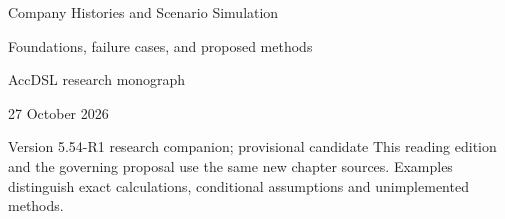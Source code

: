 \documentclass[11pt,a4paper]{report}
\begin{document}
\hypersetup{pageanchor=false}
\begin{titlepage}
{\Huge Company Histories and Scenario Simulation\par}
\vspace{12mm}
{\Large Foundations, failure cases, and proposed methods\par}
\vspace{8mm}
AccDSL research monograph\par 27 October 2026\par Version 5.54-R1 research companion; provisional candidate
\vfill
This reading edition and the governing proposal use the same new chapter sources. Examples distinguish exact calculations, conditional assumptions and unimplemented methods.
\end{titlepage}
\hypersetup{pageanchor=true}
\tableofcontents
\clearpage{}


























\clearpage\label{sim:body-end}

\begingroup\raggedright
\endgroup
\end{document}
